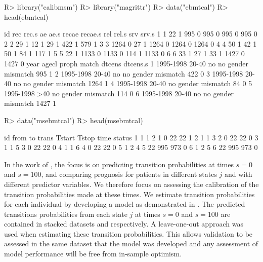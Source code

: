 \documentclass[nojss]{jss}
\begin{document}
\begin{Schunk}
\begin{Sinput}
R> library("calibmsm")
R> library("magrittr")
R> data("ebmtcal")
R> head(ebmtcal)
\end{Sinput}
\begin{Soutput}
  id  rec rec.s   ae ae.s recae recae.s  rel rel.s  srv srv.s
1  1   22     1  995    0   995       0  995     0  995     0
2  2   29     1   12    1    29       1  422     1  579     1
3  3 1264     0   27    1  1264       0 1264     0 1264     0
4  4   50     1   42    1    50       1   84     1  117     1
5  5   22     1 1133    0  1133       0  114     1 1133     0
6  6   33     1   27    1    33       1 1427     0 1427     0
       year agecl proph              match dtcens dtcens.s
1 1995-1998 20-40    no no gender mismatch    995        1
2 1995-1998 20-40    no no gender mismatch    422        0
3 1995-1998 20-40    no no gender mismatch   1264        1
4 1995-1998 20-40    no    gender mismatch     84        0
5 1995-1998   >40    no    gender mismatch    114        0
6 1995-1998 20-40    no no gender mismatch   1427        1
\end{Soutput}
\begin{Sinput}
R> data("msebmtcal")
R> head(msebmtcal)
\end{Sinput}
\begin{Soutput}
  id from to trans Tstart Tstop time status
1  1    1  2     1      0    22   22      1
2  1    1  3     2      0    22   22      0
3  1    1  5     3      0    22   22      0
4  1    1  6     4      0    22   22      0
5  1    2  4     5     22   995  973      0
6  1    2  5     6     22   995  973      0
\end{Soutput}
\end{Schunk}

In the work of \cite{DeWreede2011}, the focus is on predicting transition probabilities at times $s = 0$ and $s = 100$, and comparing prognosis for patients in different states $j$ and with different predictor variables. We therefore focus on assessing the calibration of the transition probabilities made at these times. We estimate transition probabilities for each individual by developing a model as demonstrated in \cite{DeWreede2011}. The predicted transitions probabilities from each state $j$ at times $s = 0$ and $s = 100$ are contained in stacked datasets  and  respectively. A leave-one-out approach was used when estimating these transition probabilities. This allows validation to be assessed in the same dataset that the model was developed and any assessment of model performance will be free from in-sample optimism.
\end{document}

